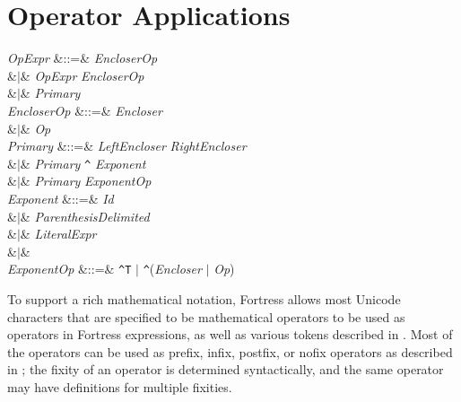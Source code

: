 %
%
%
%

\section{Operator Applications}


\begin{Grammar}
\emph{OpExpr}
&::=& \emph{EncloserOp}   \\
&$|$& \emph{OpExpr} \emph{EncloserOp}  \\
&$|$& \emph{Primary}\\

\emph{EncloserOp} &::=& \emph{Encloser}\\
&$|$& \emph{Op}\\

\emph{Primary}
&::=& \emph{LeftEncloser}   \emph{RightEncloser} \\
&$|$& \emph{Primary} \verb+^+ \emph{Exponent}\\
&$|$& \emph{Primary} \emph{ExponentOp}\\

\emph{Exponent}
&::=& \emph{Id}\\
&$|$& \emph{ParenthesisDelimited}\\
&$|$& \emph{LiteralExpr}\\
&$|$& \\

\emph{ExponentOp} &::=& \verb+^T+ $|$ \verb+^+(\emph{Encloser} $|$ \emph{Op})\\

\end{Grammar}

To support a rich mathematical notation, Fortress allows most Unicode
characters that are specified to be mathematical operators to be used as
operators in Fortress expressions, as well as various tokens described in
.
Most of the operators can be used as prefix, infix, postfix, or
nofix operators as described in ;
the fixity of an operator is determined syntactically, and
the same operator may have definitions for multiple fixities.

